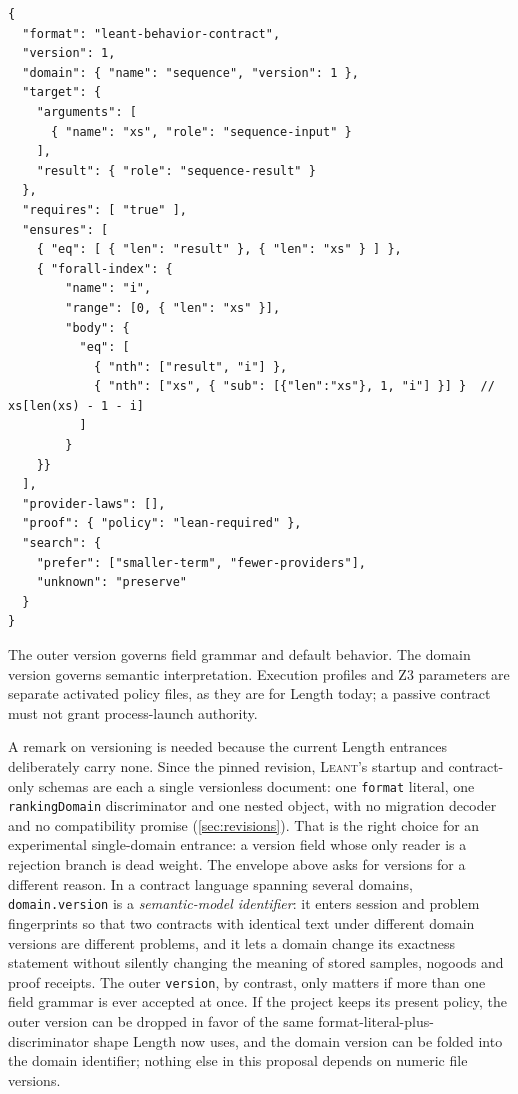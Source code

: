 \documentclass[11pt,oneside]{report}
\newcommand{\Leant}{\textsc{Leant}\xspace}
\newcommand{\code}[1]{\texttt{#1}}
\begin{document}
\begin{lstlisting}[language=JSONX,caption={Illustrative versioned contract envelope.},label={lst:contract-envelope}]
{
  "format": "leant-behavior-contract",
  "version": 1,
  "domain": { "name": "sequence", "version": 1 },
  "target": {
    "arguments": [
      { "name": "xs", "role": "sequence-input" }
    ],
    "result": { "role": "sequence-result" }
  },
  "requires": [ "true" ],
  "ensures": [
    { "eq": [ { "len": "result" }, { "len": "xs" } ] },
    { "forall-index": {
        "name": "i",
        "range": [0, { "len": "xs" }],
        "body": {
          "eq": [
            { "nth": ["result", "i"] },
            { "nth": ["xs", { "sub": [{"len":"xs"}, 1, "i"] }] }  // xs[len(xs) - 1 - i]
          ]
        }
    }}
  ],
  "provider-laws": [],
  "proof": { "policy": "lean-required" },
  "search": {
    "prefer": ["smaller-term", "fewer-providers"],
    "unknown": "preserve"
  }
}
\end{lstlisting}

The outer version governs field grammar and default behavior. The domain version governs semantic interpretation. Execution profiles and Z3 parameters are separate activated policy files, as they are for Length today; a passive contract must not grant process-launch authority.

A remark on versioning is needed because the current Length entrances deliberately carry none. Since the pinned revision, \Leant's startup and contract-only schemas are each a single versionless document: one \code{format} literal, one \code{rankingDomain} discriminator and one nested object, with no migration decoder and no compatibility promise (\cref{sec:revisions}). That is the right choice for an experimental single-domain entrance: a version field whose only reader is a rejection branch is dead weight. The envelope above asks for versions for a different reason. In a contract language spanning several domains, \code{domain.version} is a \emph{semantic-model identifier}: it enters session and problem fingerprints so that two contracts with identical text under different domain versions are different problems, and it lets a domain change its exactness statement without silently changing the meaning of stored samples, nogoods and proof receipts. The outer \code{version}, by contrast, only matters if more than one field grammar is ever accepted at once. If the project keeps its present policy, the outer version can be dropped in favor of the same format-literal-plus-discriminator shape Length now uses, and the domain version can be folded into the domain identifier; nothing else in this proposal depends on numeric file versions.
\end{document}
